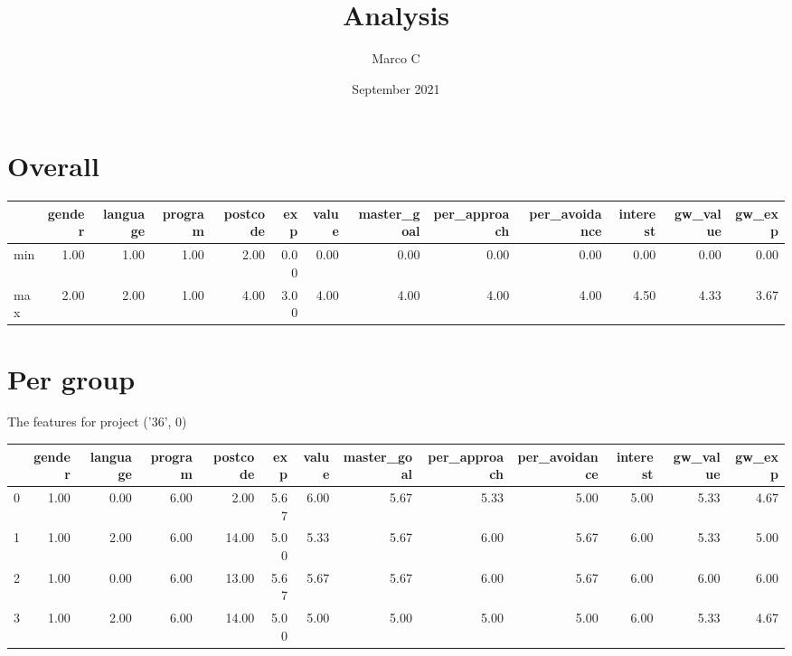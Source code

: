\documentclass[7pt]{article}
\title{Analysis}
\author{Marco C}
\date{September 2021}
\begin{document}
\begin{titlepage}
\maketitle
\end{titlepage}

\begin{landscape}

\section{Overall}
  
\begin{tabular}{lrrrrrrrrrrrr}
\toprule
{} &  gender &  language &  program &  postcode &  exp &  value &  master\_goal &  per\_approach &  per\_avoidance &  interest &  gw\_value &  gw\_exp \\
\midrule
min &    1.00 &      1.00 &     1.00 &      2.00 & 0.00 &   0.00 &         0.00 &          0.00 &           0.00 &      0.00 &             0.00 &           0.00 \\
max &    2.00 &      2.00 &     1.00 &      4.00 & 3.00 &   4.00 &         4.00 &          4.00 &           4.00 &      4.50 &             4.33 &           3.67 \\
\bottomrule
\end{tabular}


\section{Per group}

The features for project ('36', 0)\newline
\begin{tabular}{lrrrrrrrrrrrr}
\toprule
{} &  gender &  language &  program &  postcode &  exp &  value &  master\_goal &  per\_approach &  per\_avoidance &  interest &  gw\_value &  gw\_exp \\
\midrule
0 &    1.00 &      0.00 &     6.00 &      2.00 & 5.67 &   6.00 &         5.67 &          5.33 &           5.00 &      5.00 &             5.33 &           4.67 \\
1 &    1.00 &      2.00 &     6.00 &     14.00 & 5.00 &   5.33 &         5.67 &          6.00 &           5.67 &      6.00 &             5.33 &           5.00 \\
2 &    1.00 &      0.00 &     6.00 &     13.00 & 5.67 &   5.67 &         5.67 &          6.00 &           5.67 &      6.00 &             6.00 &           6.00 \\
3 &    1.00 &      2.00 &     6.00 &     14.00 & 5.00 &   5.00 &         5.00 &          5.00 &           5.00 &      6.00 &             5.33 &           4.67 \\
\bottomrule
\end{tabular}


\end{landscape}
\end{document}

